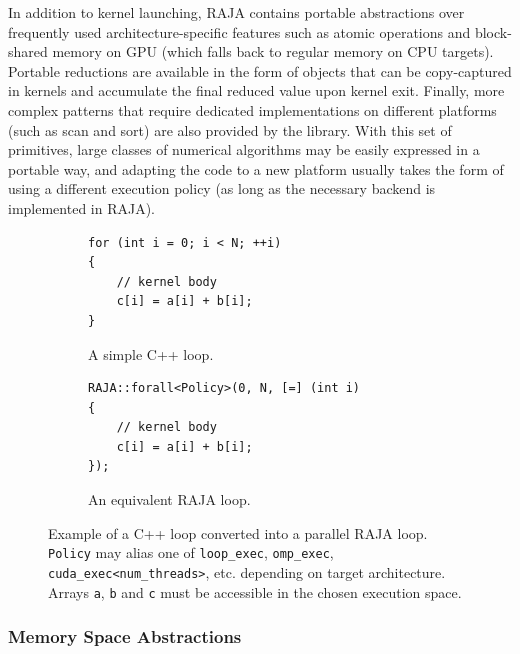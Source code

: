In addition to kernel launching, RAJA contains portable abstractions over frequently used architecture-specific features such as atomic operations and block-shared memory on GPU (which falls back to regular memory on CPU targets).   Portable reductions are available in the form of objects that can be copy-captured in kernels and accumulate the final reduced value upon kernel exit.   Finally, more complex patterns that require dedicated implementations on different platforms (such as scan and sort) are also provided by the library.   With this set of primitives, large classes of numerical algorithms may be easily expressed in a portable way, and adapting the code to a new platform usually takes the form of using a different execution policy (as long as the necessary backend is implemented in RAJA).

\begin{figure} [htbp]
  \begin{subfigure}[t]{0.45\textwidth}
    \centering
    \begin{verbatim}
for (int i = 0; i < N; ++i)
{
    // kernel body
    c[i] = a[i] + b[i];
}
    \end{verbatim}
    \caption{\label{fig:raja_example_cpp} A simple C++ loop.}
  \end{subfigure}
  \hfill
  \begin{subfigure}[t]{0.45\textwidth}
    \centering
    \begin{verbatim}
RAJA::forall<Policy>(0, N, [=] (int i)
{ 
    // kernel body
    c[i] = a[i] + b[i]; 
});
    \end{verbatim}
    \caption{\label{fig:raja_example_raja} An equivalent RAJA loop.}
\end{subfigure}
\caption[RAJA loop example]{\label{fig:raja_example} Example of a C++ loop converted into a parallel RAJA loop. \texttt{Policy} may alias one of \texttt{loop\_exec}, \texttt{omp\_exec}, \texttt{cuda\_exec<num\_threads>}, etc. depending on target architecture.   Arrays \texttt{a}, \texttt{b} and \texttt{c} must be accessible in the chosen execution space.}
\end{figure}

\subsubsection{Memory Space Abstractions}

